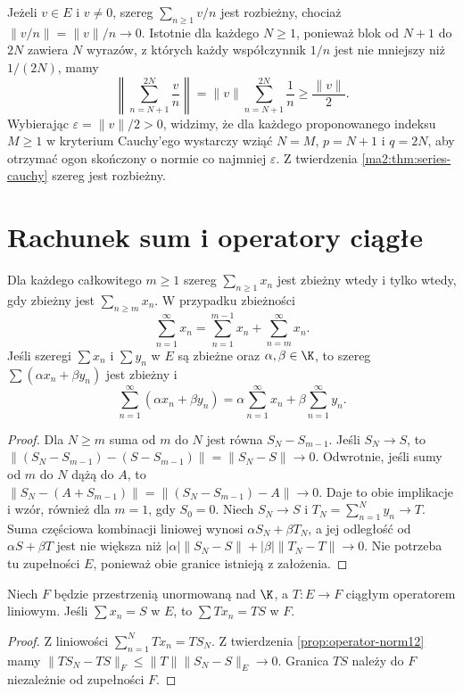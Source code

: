 \begin{przyklad}
\label{ma2:ex:vector-harmonic}
Jeżeli $v\in E$ i $v\ne0$, szereg $\sum_{n\ge1}v/n$
jest rozbieżny, chociaż $\|v/n\|=\|v\|/n\to0$.
Istotnie dla każdego $N\ge1$, ponieważ blok od $N+1$ do $2N$
zawiera $N$ wyrazów, z których każdy współczynnik $1/n$
jest nie mniejszy niż $1/(2N)$, mamy
\[
 \left\|\sum_{n=N+1}^{2N}\frac vn\right\|
 =\|v\|\sum_{n=N+1}^{2N}\frac1n\ge\frac{\|v\|}{2}.
\]
Wybierając $\varepsilon=\|v\|/2>0$, widzimy, że dla
każdego proponowanego indeksu $M\ge1$ w kryterium Cauchy'ego
wystarczy wziąć $N=M$, $p=N+1$ i $q=2N$, aby otrzymać
ogon skończony o normie co najmniej $\varepsilon$.
Z twierdzenia \ref{ma2:thm:series-cauchy} szereg jest rozbieżny.
\end{przyklad}

\section{Rachunek sum i operatory ciągłe}
\begin{twierdzenie}
\label{ma2:thm:series-linear-tail}
Dla każdego całkowitego $m\ge1$ szereg $\sum_{n\ge1}x_n$
jest zbieżny wtedy i tylko wtedy, gdy zbieżny jest
$\sum_{n\ge m}x_n$. W przypadku zbieżności
\[
 \sum_{n=1}^\infty x_n=\sum_{n=1}^{m-1}x_n+
                       \sum_{n=m}^\infty x_n.
\]
Jeśli szeregi $\sum x_n$ i $\sum y_n$ w $E$ są zbieżne
oraz $\alpha,\beta\in\K$, to szereg $\sum(\alpha x_n+\beta y_n)$
jest zbieżny i
\[
 \sum_{n=1}^\infty(\alpha x_n+\beta y_n)
 =\alpha\sum_{n=1}^\infty x_n+\beta\sum_{n=1}^\infty y_n.
\]
\end{twierdzenie}
\begin{proof}
Dla $N\ge m$ suma od $m$ do $N$ jest równa $S_N-S_{m-1}$.
Jeśli $S_N\to S$, to
$\|(S_N-S_{m-1})-(S-S_{m-1})\|=\|S_N-S\|\to0$.
Odwrotnie, jeśli sumy od $m$ do $N$ dążą do $A$, to
$\|S_N-(A+S_{m-1})\|=\|(S_N-S_{m-1})-A\|\to0$.
Daje to obie implikacje i wzór, również dla $m=1$,
gdy $S_0=0$.
Niech $S_N\to S$ i $T_N=\sum_{n=1}^N y_n\to T$.
Suma częściowa kombinacji liniowej wynosi
$\alpha S_N+\beta T_N$, a jej odległość od
$\alpha S+\beta T$ jest nie większa niż
$|\alpha|\|S_N-S\|+|\beta|\|T_N-T\|\to0$.
Nie potrzeba tu zupełności $E$, ponieważ obie granice
istnieją z założenia.
\end{proof}

\begin{twierdzenie}
\label{ma2:thm:series-operator}
Niech $F$ będzie przestrzenią unormowaną nad $\K$,
a $T:E\to F$ ciągłym operatorem liniowym.
Jeśli $\sum x_n=S$ w $E$, to $\sum Tx_n=TS$ w $F$.
\end{twierdzenie}
\begin{proof}
Z liniowości $\sum_{n=1}^N Tx_n=TS_N$.
Z twierdzenia \ref{prop:operator-norm12} mamy
$\|TS_N-TS\|_F\le\|T\|\|S_N-S\|_E\to0$.
Granica $TS$ należy do $F$ niezależnie od zupełności $F$.
\end{proof}

